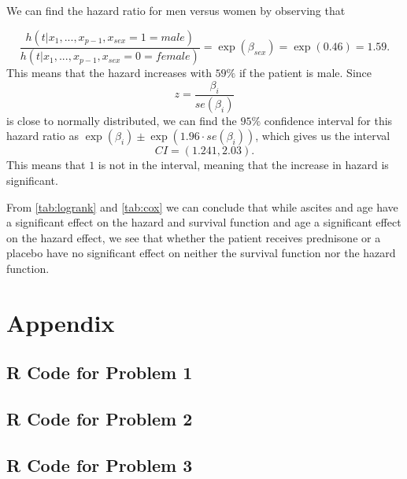 \documentclass[a4paper,norsk, 10pt]{article}
\begin{document}
We can find the hazard ratio for men versus women by observing that

\begin{equation}
\frac{h(t|x_1,...,x_{p-1},x_{sex} = 1 = male)}{h(t|x_1,...,x_{p-1},x_{sex} = 0 = female)} = \exp(\beta_{sex}) = \exp(0.46) = 1.59.
\end{equation}
This means that the hazard increases with $59\%$ if the patient is male. Since
\begin{equation}
z = \frac{\beta_i}{se(\beta_i)}
\end{equation}
is close to normally distributed, we can find the $95\%$ confidence interval for this hazard ratio as $\exp(\beta_i) \pm \exp(1.96\cdot se(\beta_i))$, which gives us the interval
\begin{equation}
CI = (1.241,2.03).
\end{equation}
This means that $1$ is not in the interval, meaning that the increase in hazard is significant.

From \ref{tab:logrank} and \ref{tab:cox} we can conclude that while ascites and age have a significant effect on the hazard and survival function and age a significant effect on the hazard effect, we see that whether the patient receives prednisone or a placebo have no significant effect on neither the survival function nor the hazard function.



\newpage
\section*{Appendix}
\subsection*{R Code for Problem 1}



\newpage

\subsection*{R Code for Problem 2}



\subsection*{R Code for Problem 3}


\end{document}
